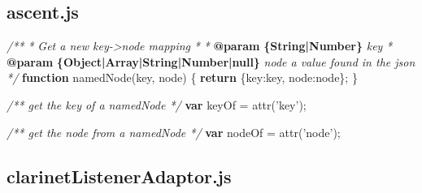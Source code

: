 \documentclass[12pt, ]{article}
\newenvironment{Shaded}{}{}
\newcommand{\KeywordTok}[1]{\textcolor[rgb]{0.00,0.44,0.13}{\textbf{{#1}}}}
\newcommand{\DataTypeTok}[1]{\textcolor[rgb]{0.56,0.13,0.00}{{#1}}}
\newcommand{\StringTok}[1]{\textcolor[rgb]{0.25,0.44,0.63}{{#1}}}
\newcommand{\CommentTok}[1]{\textcolor[rgb]{0.38,0.63,0.69}{\textit{{#1}}}}
\newcommand{\FunctionTok}[1]{\textcolor[rgb]{0.02,0.16,0.49}{{#1}}}
\newcommand{\NormalTok}[1]{{#1}}
\begin{document}
\subsection{ascent.js}\label{headerux5fascent}

\label{src_ascent}

\begin{Shaded}
\begin{Highlighting}[]
\CommentTok{/**}
\CommentTok{ * Get a new key->node mapping}
\CommentTok{ * }
\CommentTok{ * }\KeywordTok{@param}\CommentTok{ }\KeywordTok{\{String|Number\}}\CommentTok{ key}
\CommentTok{ * }\KeywordTok{@param}\CommentTok{ }\KeywordTok{\{Object|Array|String|Number|null\}}\CommentTok{ node a value found in the json}
\CommentTok{ */}
\KeywordTok{function} \FunctionTok{namedNode}\NormalTok{(key, node) \{}
   \KeywordTok{return} \NormalTok{\{}\DataTypeTok{key}\NormalTok{:key, }\DataTypeTok{node}\NormalTok{:node\};}
\NormalTok{\}}

\CommentTok{/** get the key of a namedNode */}
\KeywordTok{var} \NormalTok{keyOf = }\FunctionTok{attr}\NormalTok{(}\StringTok{'key'}\NormalTok{);}

\CommentTok{/** get the node from a namedNode */}
\KeywordTok{var} \NormalTok{nodeOf = }\FunctionTok{attr}\NormalTok{(}\StringTok{'node'}\NormalTok{);}
\end{Highlighting}
\end{Shaded}

\pagebreak

\subsection{clarinetListenerAdaptor.js}\label{headerux5fclarinetListenerAdaptor}

\label{src_clarinetListenerAdaptor}
\end{document}
